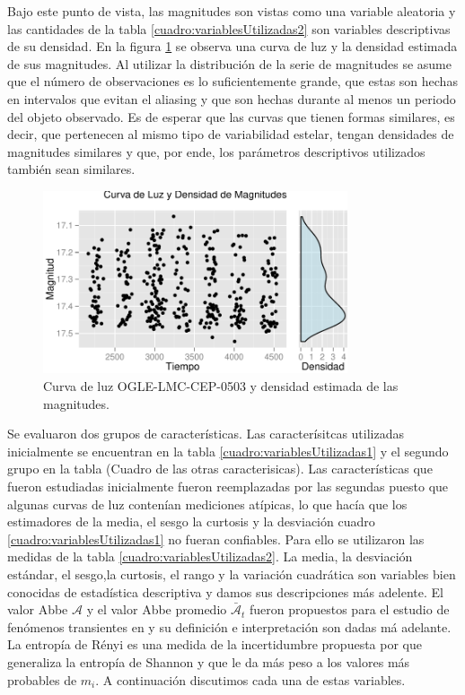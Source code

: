 \documentclass[letterpaper,12pt]{book}
\begin{document}
Bajo este punto de vista, las magnitudes son vistas como una variable aleatoria y las cantidades de la tabla \ref{cuadro:variablesUtilizadas2} son variables descriptivas de su densidad. En la figura \ref{fig:curvaHist} se observa una curva de luz y la densidad estimada de sus magnitudes. Al utilizar la distribución de la serie de magnitudes se asume que el número de observaciones es lo suficientemente grande, que estas son hechas en intervalos que evitan el aliasing y que son hechas durante al menos un periodo del objeto observado. Es de esperar que las curvas que tienen formas similares, es decir, que pertenecen al mismo tipo de variabilidad estelar, tengan densidades de magnitudes similares y que, por ende, los parámetros descriptivos utilizados también sean similares.


\begin{figure}
  \centering
  \includegraphics[width = 0.8\textwidth]{./img/CClasificacion/curvaHist.pdf}
  \caption{Curva de luz OGLE-LMC-CEP-0503 y densidad estimada de las magnitudes. }
  \label{fig:curvaHist}
  \centering
\end{figure}

Se evaluaron dos grupos de características.  Las caracterísitcas utilizadas inicialmente se encuentran en la tabla  \ref{cuadro:variablesUtilizadas1} y el segundo grupo en la tabla (Cuadro de las otras caracterisicas). Las características que fueron estudiadas inicialmente fueron reemplazadas por las segundas puesto que algunas curvas de luz contenían mediciones atípicas, lo que hacía que los estimadores de la media, el sesgo la curtosis y la desviación cuadro \ref{cuadro:variablesUtilizadas1} no fueran confiables. Para ello se utilizaron  las medidas de la tabla \ref{cuadro:variablesUtilizadas2}. La media, la desviación estándar, el sesgo,la curtosis, el rango y la variación cuadrática son variables bien conocidas de estadística descriptiva y damos sus descripciones más adelente. El valor Abbe $\mathcal{A}$ y el valor Abbe promedio $\bar{\mathcal{A}}_t$ fueron propuestos para el estudio de fenómenos transientes en \cite{mowlavi_searching_2014} y su definición e interpretación son dadas má adelante. La entropía de Rényi es una medida de la incertidumbre propuesta por \cite{renyi_measures_1961} que generaliza la entropía de Shannon \cite{shannon_mathematical_1948} y que le da más peso a los valores más probables de $m_i$. A continuación discutimos cada una de estas variables.
\end{document}
